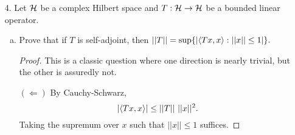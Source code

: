 \begin{itemize}
\begin{enumerate}[(a)]
\begin{proof}
\medskip 

Equality is attained by the sequence $f_n(x) = x^{1/n}$. Each $||f_n||_{\infty} = 1$, and $|l(f)| = \frac{n}{n+1}$. Thus $||l|| = 1$. 
\end{proof}

\item Let $l$ be the linear functional from (b). Prove that there exists no $f \in C_0[0, 1]$
with $||f||_{\infty}$ such that $l(f) = ||l||$.
\begin{proof}
For $l(f) = ||l||$ to be true, the function $f$ must look like the constant $1$ function everywhere except $f(0)$. But to be continuous, there must be a region around the origin where $f$ is not the constant $1$ function. Thus the integral cannot be fully $1$. 

\medskip 

\textit{This contains two common themes in recent prelims: equality must be attained by a sequence, and there is some sort of give-and-take condition. i.e.: if $f$ is continuous, it violates the integral requirement. If it satisfies the integral, it cannot be continuous.}
\end{proof}
\end{enumerate}




\item[4.] Let $\mathcal{H}$ be a complex Hilbert space and $T : \mathcal{H} \rightarrow \mathcal{H}$ be a bounded linear operator.
\begin{enumerate}[(a)]
\item Prove that if $T$ is self-adjoint, then $||T|| = \sup\{|\langle{}Tx,x\rangle : ||x|| \leq 1|\}.$
\begin{proof}
This is a classic question where one direction is nearly trivial, but the other is assuredly not. 

\medskip 

$(\Leftarrow)$ By Cauchy-Schwarz, 
$$|\langle{}Tx,x\rangle| \leq ||T|| \ ||x||^2.$$
Taking the supremum over $x$ such that $||x|| \leq 1$ suffices.

\medskip 


\end{proof}
\end{enumerate}
\end{itemize}
